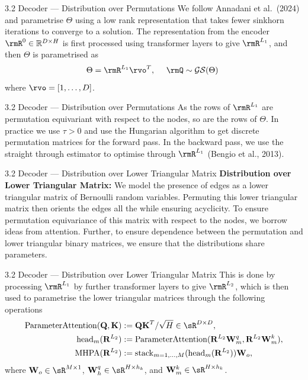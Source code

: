 \documentclass[aspectratio=169,10pt]{beamer}
\begin{document}
\begin{frame}{3.2 Decoder --- Distribution over Permutations}
\small
We follow Annadani et al.\ (2024) and parametrise $\Theta$ using a low rank representation that takes fewer sinkhorn iterations to converge to a solution. The representation from the encoder $\rmR^0 \in \mathbb{R}^{D \times H}$ is first processed using transformer layers to give $\rmR^{L_1}$, and then $\Theta$ is parametrised as
\begin{align*}
    \Theta = \rmR^{L_1}\rvo^T, \ \ \ \ \rmQ \sim \mathcal{GS}(\Theta) \
\end{align*}
where $\rvo = [1, \ldots, D]$.
\end{frame}

\begin{frame}{3.2 Decoder --- Distribution over Permutations}
As the rows of $\rmR^{L_1}$ are permutation equivariant with respect to the nodes, so are the rows of $\Theta$. In practice we use $\tau > 0$ and use the Hungarian algorithm to get discrete permutation matrices for the forward pass. In the backward pass, we use the straight through estimator to optimise through $\rmR^{L_1}$ (Bengio et al., 2013).
\end{frame}

\begin{frame}{3.2 Decoder --- Distribution over Lower Triangular Matrix}
\small
\textbf{Distribution over Lower Triangular Matrix:}\quad
We model the presence of edges as a lower triangular matrix of Bernoulli random variables. Permuting this lower triangular matrix then orients the edges all the while ensuring acyclicity. To ensure permutation equivariance of this matrix with respect to the nodes, we borrow ideas from attention. Further, to ensure dependence between the permutation and lower triangular binary matrices, we ensure that the distributions share parameters.
\end{frame}

\begin{frame}{3.2 Decoder --- Distribution over Lower Triangular Matrix}
\small
This is done by processing $\rmR^{L_1}$ by further transformer layers to give $\rmR^{L_2}$, which is then used to parametrise the lower triangular matrices through the following operations
\begin{align*} \operatorname{ParameterAttention}(\mathbf{Q,K}) &:= \mathbf{QK}^T / \sqrt{H} \in \sR^{D \times D}, \\
    \operatorname{head}_m(\mathbf{R}^{L_2}) &:= \operatorname{ParameterAttention}(\mathbf{R}^{L_2}\mathbf{W}^q_m, \mathbf{R}^{L_2} \mathbf{W}^k_m), \\
    \operatorname{MHPA}(\mathbf{R}^{L_2}) &:= \operatorname{stack}_{m=1,\ldots,M}(\operatorname{head}_m(\mathbf{R}^{L_2})) \mathbf{W}_o,
\end{align*}
where $\mathbf{W}_o \in \sR^{M \times 1}$, $\mathbf{W}^q_h \in \sR^{H \times h_k}$, and $\mathbf{W}^k_m \in \sR^{H \times h_k}$.
\end{frame}
\end{document}
